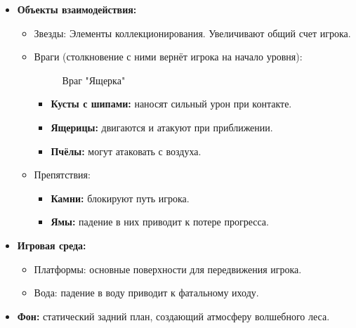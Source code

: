 \documentclass{article}
\begin{document}
\begin{itemize}
\begin{itemize}
        
        \item \textbf{Объекты взаимодействия:}
        \begin{itemize}
            \item Звезды: Элементы коллекционирования. Увеличивают общий счет игрока.
            \item Враги (столкновение с ними вернёт игрока на начало уровня):
            \begin{figure}[h]
            \caption{Враг "Ящерка"}
            \label{ris:image}
            \end{figure}
            \begin{itemize}
                \item \textbf{Кусты с шипами:} наносят сильный урон при контакте.
                \item \textbf{Ящерицы:} двигаются и атакуют при приближении.
                \item \textbf{Пчёлы:} могут атаковать с воздуха.
            \end{itemize}
	    \item Препятствия:
            \begin{itemize}
                \item \textbf{Камни:} блокируют путь игрока.
                \item \textbf{Ямы:} падение в них приводит к потере прогресса.
            \end{itemize}
        \end{itemize}
        \item \textbf{Игровая среда:}
        \begin{itemize}
            \item Платформы: основные поверхности для передвижения игрока.
            \item Вода: падение в воду приводит к фатальному иходу.
        \end{itemize}
        \item \textbf{Фон:} статический задний план, создающий атмосферу волшебного леса.
    \end{itemize}
\end{itemize}
\end{document}
